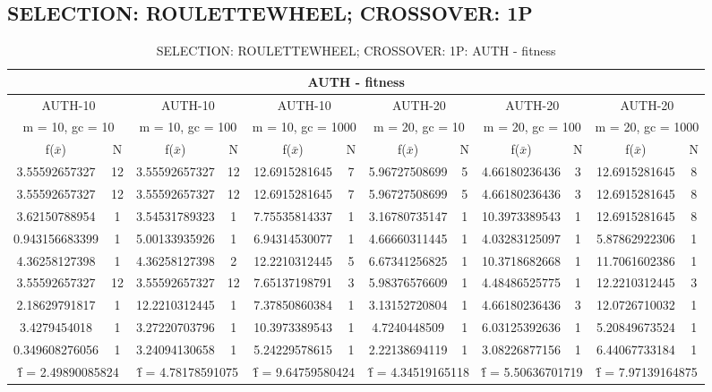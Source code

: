 \subsection{SELECTION: ROULETTEWHEEL; CROSSOVER: 1P}
\begin{table}[H]
	\centering
	\caption{SELECTION: ROULETTEWHEEL; CROSSOVER: 1P: AUTH - fitness}
	\begin{adjustbox}{width=1\textwidth}
		\begin{tabular}{ |c|c||c|c||c|c||c|c||c|c||c|c| }
			\hline
			\multicolumn{12}{|c|}{AUTH - fitness} \\
			\hline
			\multicolumn{2}{|c||}{AUTH-10} & \multicolumn{2}{c||}{AUTH-10} & \multicolumn{2}{c||}{AUTH-10} & \multicolumn{2}{c||}{AUTH-20} & \multicolumn{2}{c||}{AUTH-20} & \multicolumn{2}{c|}{AUTH-20}\\
			\hline
			\multicolumn{2}{|c||}{m = 10, gc = 10} & \multicolumn{2}{c||}{m = 10, gc = 100} & \multicolumn{2}{c||}{m = 10, gc = 1000} & \multicolumn{2}{c||}{m = 20, gc = 10} & \multicolumn{2}{c||}{m = 20, gc = 100} & \multicolumn{2}{c|}{m = 20, gc = 1000}\\
			\hline
			f($\bar{x}$) & N & f($\bar{x}$) & N & f($\bar{x}$) & N & f($\bar{x}$) & N & f($\bar{x}$) & N & f($\bar{x}$) & N\\
			\hline
			\hline
			3.55592657327 & 12 & 3.55592657327 & 12 & 12.6915281645 & 7 & 5.96727508699 & 5 & 4.66180236436 & 3 & 12.6915281645 & 8\\
			\hline
			3.55592657327 & 12 & 3.55592657327 & 12 & 12.6915281645 & 7 & 5.96727508699 & 5 & 4.66180236436 & 3 & 12.6915281645 & 8\\
			3.62150788954 & 1 & 3.54531789323 & 1 & 7.75535814337 & 1 & 3.16780735147 & 1 & 10.3973389543 & 1 & 12.6915281645 & 8\\
			0.943156683399 & 1 & 5.00133935926 & 1 & 6.94314530077 & 1 & 4.66660311445 & 1 & 4.03283125097 & 1 & 5.87862922306 & 1\\
			4.36258127398 & 1 & 4.36258127398 & 2 & 12.2210312445 & 5 & 6.67341256825 & 1 & 10.3718682668 & 1 & 11.7061602386 & 1\\
			3.55592657327 & 12 & 3.55592657327 & 12 & 7.65137198791 & 3 & 5.98376576609 & 1 & 4.48486525775 & 1 & 12.2210312445 & 3\\
			2.18629791817 & 1 & 12.2210312445 & 1 & 7.37850860384 & 1 & 3.13152720804 & 1 & 4.66180236436 & 3 & 12.0726710032 & 1\\
			3.4279454018 & 1 & 3.27220703796 & 1 & 10.3973389543 & 1 & 4.7240448509 & 1 & 6.03125392636 & 1 & 5.20849673524 & 1\\
			0.349608276056 & 1 & 3.24094130658 & 1 & 5.24229578615 & 1 & 2.22138694119 & 1 & 3.08226877156 & 1 & 6.44067733184 & 1\\
			\hline
			\multicolumn{2}{|c||}{\^{f} = 2.49890085824} & \multicolumn{2}{c||}{\^{f} = 4.78178591075} & \multicolumn{2}{c||}{\^{f} = 9.64759580424} & \multicolumn{2}{c||}{\^{f} = 4.34519165118} & \multicolumn{2}{c||}{\^{f} = 5.50636701719} & \multicolumn{2}{c|}{\^{f} = 7.97139164875}\\
			\hline
		\end{tabular}
	\end{adjustbox}
\end{table}
